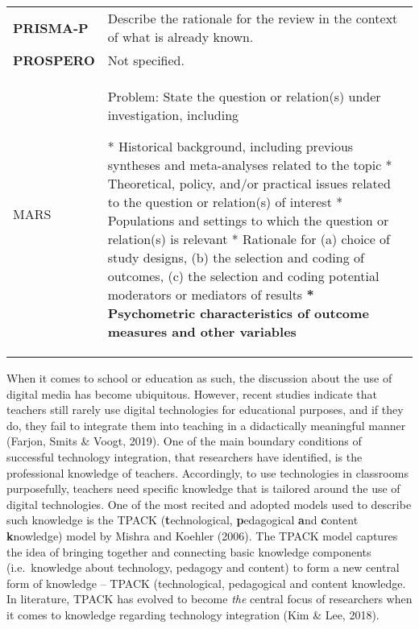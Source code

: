 \documentclass[
]{article}
\begin{document}
\hypertarget{ram}{}
\begin{collapse}

\begin{table}[H]
\centering
\begin{tabular}{>{}l|l}
\hline
\cellcolor[HTML]{ececec}{source} & \cellcolor[HTML]{ececec}{description}\\
\hline
\textbf{PRISMA-P} & Describe the rationale for the review in the context of what is already known.\\
\hline
\textbf{PROSPERO} & Not specified.\\
\hline
MARS & Problem: State the question or relation(s) under investigation, including

* Historical background, including previous syntheses and meta-analyses related to the topic 
* Theoretical, policy, and/or practical issues related to the question or relation(s) of interest
* Populations and settings to which the question or relation(s) is relevant
* Rationale for
   (a) choice of study designs, 
   (b) the selection and coding of outcomes, 
   (c) the selection and coding potential moderators or mediators of results 
\textbf{* Psychometric characteristics of outcome measures and other variables}\\
\hline
\end{tabular}
\end{table}

\end{collapse}

When it comes to school or education as such, the discussion about the
use of digital media has become ubiquitous. However, recent studies
indicate that teachers still rarely use digital technologies for
educational purposes, and if they do, they fail to integrate them into
teaching in a didactically meaningful manner (Farjon, Smits \& Voogt,
2019). One of the main boundary conditions of successful technology
integration, that researchers have identified, is the professional
knowledge of teachers. Accordingly, to use technologies in classrooms
purposefully, teachers need specific knowledge that is tailored around
the use of digital technologies. One of the most recited and adopted
models used to describe such knowledge is the TPACK
(\textbf{t}echnological, \textbf{p}edagogical \textbf{a}nd
\textbf{c}ontent \textbf{k}nowledge) model by Mishra and Koehler (2006).
The TPACK model captures the idea of bringing together and connecting
basic knowledge components (i.e.~knowledge about technology, pedagogy
and content) to form a new central form of knowledge -- TPACK
(technological, pedagogical and content knowledge. In literature, TPACK
has evolved to become \emph{the} central focus of researchers when it
comes to knowledge regarding technology integration (Kim \& Lee, 2018).
\end{document}
